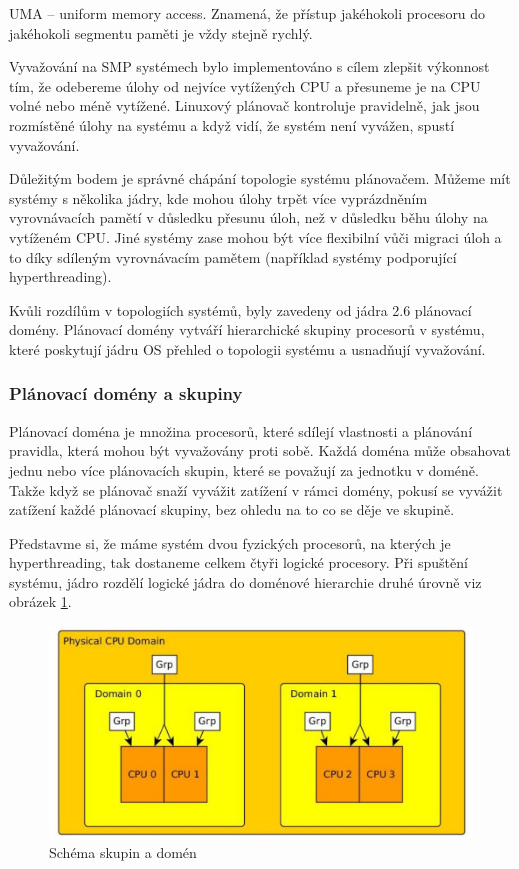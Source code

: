 \documentclass[
  field=ainfk,
  biblatex,
  glossaries,
  index
]{kidiplom}
\begin{document}
UMA – uniform memory access. Znamená, že přístup jakéhokoli procesoru do jakéhokoli segmentu paměti je vždy stejně rychlý.

Vyvažování na SMP systémech bylo implementováno s cílem zlepšit výkonnost tím, že odebereme úlohy od nejvíce vytížených CPU a přesuneme je na CPU volné nebo méně vytížené. Linuxový plánovač kontroluje pravidelně, jak jsou rozmístěné úlohy na systému a když vidí, že systém není vyvážen, spustí vyvažování.

Důležitým bodem je správné chápání topologie systému plánovačem. Můžeme mít systémy s několika jádry, kde mohou úlohy trpět více vyprázdněním vyrovnávacích pamětí v důsledku přesunu úloh, než v důsledku běhu úlohy na vytíženém CPU. Jiné systémy zase mohou být více flexibilní vůči migraci úloh a to díky sdíleným vyrovnávacím pamětem (například systémy podporující hyperthreading).

Kvůli rozdílům v topologiích systémů, byly zavedeny od jádra 2.6 plánovací domény. Plánovací domény vytváří hierarchické skupiny procesorů v systému, které poskytují jádru OS přehled o topologii systému a usnadňují vyvažování.

\newpage
\subsubsection{Plánovací domény a skupiny}

Plánovací doména je množina procesorů, které sdílejí vlastnosti a plánování pravidla, která mohou být vyvažovány proti sobě. Každá doména může obsahovat jednu nebo více plánovacích skupin, které se považují za jednotku v doméně. Takže když se plánovač snaží vyvážit zatížení v rámci domény, pokusí se vyvážit zatížení každé plánovací skupiny, bez ohledu na to co se děje ve skupině.

Představme si, že máme systém dvou fyzických procesorů, na kterých je hyperthreading, tak dostaneme celkem čtyři logické procesory. Při spuštění systému, jádro rozdělí logické jádra do doménové hierarchie druhé úrovně viz obrázek \ref{domeny a skupiny}.

\begin{figure}[ht]
\includegraphics[scale=0.53]{obrazky/domenyAskupiny.jpeg}
\caption{Schéma skupin a domén}
\label{domeny a skupiny}
\end{figure}
\end{document}
